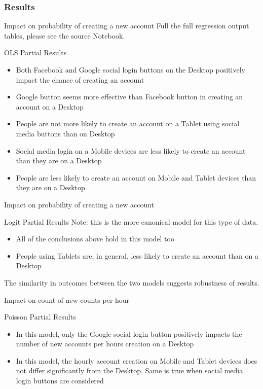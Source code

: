 \documentclass{beamer}
\begin{document}
			\subsubsection{Results}
			\begin{frame}{Impact on probability of creating a new account}
				Full the full regression output tables, please see the source Notebook.
					\begin{block}{OLS Partial Results}
						\begin{itemize}
							\item Both Facebook and Google social login buttons on the Desktop positively impact the chance of creating an account
							\item Google button seems more effective than Facebook button in creating an account on a Desktop
							\item People are not more likely to create an account on a Tablet using social media buttons than on Desktop
							\item Social media login on a Mobile devices are less likely to create an account than they are on a Desktop
							\item People are less likely to create an account on Mobile and Tablet devices than they are on a Desktop
						\end{itemize}
					\end{block}
			\end{frame}
			\begin{frame}{Impact on probability of creating a new account}		
					\begin{block}{Logit Partial Results}
						Note: this is the more canonical model for this type of data. 
						\begin{itemize}
							\item All of the conclusions above hold in this model too
							\item People using Tablets are, in general, less likely to create an account than on a Desktop
						\end{itemize}
					\end{block}
					The similarity in outcomes between the two models suggests robustness of results.
			\end{frame}
			
			\begin{frame}{Impact on count of new counts per hour}
				\begin{block}{Poisson Partial Results}
					\begin{itemize}
						\item In this model, only the Google social login button positively impacts the number of new accounts per hours creation on a Desktop
						\item In this model, the hourly account creation on Mobile and Tablet devices does not differ significantly from the Desktop. Same is true when social media login buttons are considered
					\end{itemize}
				\end{block}
			\end{frame}
			
\end{document}
